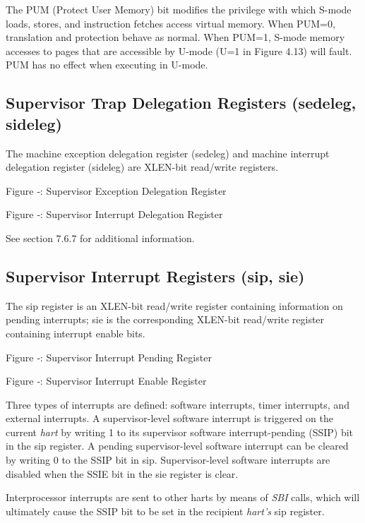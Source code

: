 The PUM (Protect User Memory) bit modifies the privilege with which
S-mode loads, stores, and instruction fetches access virtual memory.
When PUM=0, translation and protection behave as normal. When PUM=1,
S-mode memory accesses to pages that are accessible by U-mode (U=1 in
Figure 4.13) will fault. PUM has no effect when executing in U-mode.

\subsection{Supervisor Trap Delegation Registers (sedeleg,
sideleg)}\label{supervisor-trap-delegation-registers-sedeleg-sideleg}

The machine exception delegation register (sedeleg) and machine
interrupt delegation register (sideleg) are XLEN-bit read/write
registers.

\missingfigure{}

Figure ‑: Supervisor Exception Delegation Register

\missingfigure{}

Figure ‑: Supervisor Interrupt Delegation Register

See section 7.6.7 for additional information.

\subsection{Supervisor Interrupt Registers (sip, sie)}

The sip register is an XLEN-bit read/write register containing
information on pending interrupts; sie is the corresponding XLEN-bit
read/write register containing interrupt enable bits.

\missingfigure{}

Figure ‑: Supervisor Interrupt Pending Register

\missingfigure{}

Figure ‑: Supervisor Interrupt Enable Register

Three types of interrupts are defined: software interrupts, timer
interrupts, and external interrupts. A supervisor-level software
interrupt is triggered on the current \emph{hart} by writing 1 to its
supervisor software interrupt-pending (SSIP) bit in the sip register. A
pending supervisor-level software interrupt can be cleared by writing 0
to the SSIP bit in sip. Supervisor-level software interrupts are
disabled when the SSIE bit in the sie register is clear.

Interprocessor interrupts are sent to other harts by means of \emph{SBI}
calls, which will ultimately cause the SSIP bit to be set in the
recipient \emph{hart's} sip register.

